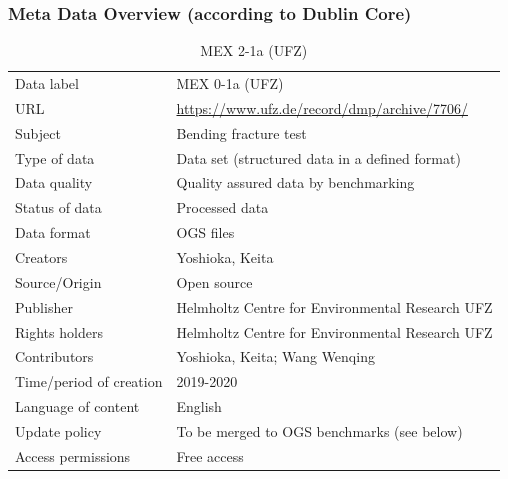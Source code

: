 \subsubsection*{Meta Data Overview (according to Dublin Core)}
\begin{table}[!ht]
\caption{MEX 2-1a (UFZ)}
\label{tab:dms-mex2-1a-ufz}
\small
\begin{tabular}{R{3.5cm}|L{7.5cm}}
\hline
%
Data label & MEX 0-1a (UFZ) \\
URL & \url{https://www.ufz.de/record/dmp/archive/7706/} \\ 
Subject  & Bending fracture test \\
Type of data  & Data set (structured data in a defined format) \\
Data quality  & Quality assured data by benchmarking \\
Status of data  & Processed data \\
Data format  & OGS files \\
Creators  & Yoshioka, Keita  \\
Source/Origin & Open source \\
Publisher  & Helmholtz Centre for Environmental Research UFZ \\
Rights holders & Helmholtz Centre for Environmental Research UFZ \\
Contributors & Yoshioka, Keita; Wang Wenqing \\
Time/period of creation & 2019-2020 \\
Language of content & English \\
Update policy & To be merged to OGS benchmarks (see below) \\
Access permissions & Free access \\
%
\hline
\end{tabular}
\end{table}

